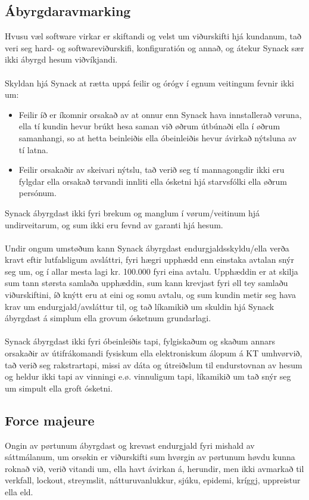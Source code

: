 \subsection{Ábyrgdaravmarking}
Hvusu væl software virkar er skiftandi og velst um viðurskifti hjá kundanum, tað veri seg hard- og softwareviðurskifi, konfiguratión og annað, og átekur Synack sær ikki ábyrgd hesum viðvíkjandi. \\ \\
Skyldan hjá Synack at rætta uppá feilir og órógv í egnum veitingum fevnir ikki um:
\begin{itemize}
	\item Feilir íð er íkomnir orsakað av at onnur enn Synack hava innstallerað vøruna, ella tí kundin hevur brúkt hesa saman við øðrum útbúnaði ella í øðrum samanhangi, so at hetta beinleiðis ella óbeinleiðis hevur ávirkað nýtsluna av tí latna.
	\item Feilir orsakaðir av skeivari nýtslu, tað verið seg tí mannagongdir ikki eru fylgdar ella orsakað tørvandi	innliti ella ósketni hjá starvsfólki ella øðrum persónum.
\end{itemize}
Synack ábyrgdast ikki fyri brekum og manglum í vørum/veitinum hjá undirveitarum, og sum ikki eru fevnd av garanti hjá hesum. \\ \\
Undir ongum umstøðum kann Synack ábyrgdast endurgjaldsskyldu/ella verða kravt eftir lutfalsligum avsláttri, fyri hægri upphædd enn einstaka avtalan snýr seg um, og í allar mesta lagi kr. 100.000 fyri eina avtalu. Upphæddin er at skilja sum tann størsta samlaða upphæddin, sum kann krevjast fyri øll tey samlaðu viðurskiftini, íð knýtt eru at eini og somu avtalu, og sum kundin metir seg hava krav um endurgjald/avsláttur til, og tað líkamikið um skuldin hjá Synack ábyrgdast á simplum ella grovum ósketnum grundarlagi. \\ \\
Synack ábyrgdast ikki fyri óbeinleiðis tapi, fylgiskaðum og skaðum annars orsakaðir av útifrákomandi fysiskum ella elektroniskum álopum á KT umhvørvið, tað verið seg rakstrartapi, missi av dáta og útreiðslum til endurstovnan av hesum og heldur ikki tapi av vinningi e.ø. vinnuligum tapi, líkamikið um tað snýr seg um simpult ella groft ósketni.

\subsection{Force majeure}
Ongin av pørtunum ábyrgdast og krevast endurgjald fyri mishald av sáttmálanum, um orsøkin er viðurskifti sum hvørgin av pørtunum høvdu kunna roknað við, verið vitandi um, ella havt ávirkan á, herundir, men ikki avmarkað til verkfall, lockout, streymslit, nátturuvanlukkur, sjúku, epidemi, kríggj, uppreistur ella eld.

